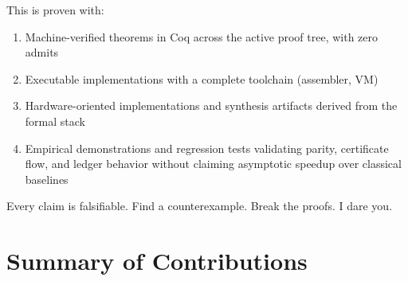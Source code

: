 This is proven with:
\begin{enumerate}
    \item Machine-verified theorems in Coq across the active proof tree, with zero admits
    \item Executable implementations with a complete toolchain (assembler, VM)
    \item Hardware-oriented implementations and synthesis artifacts derived from the formal stack
    \item Empirical demonstrations and regression tests validating parity, certificate flow, and ledger behavior without claiming asymptotic speedup over classical baselines
\end{enumerate}

Every claim is falsifiable. Find a counterexample. Break the proofs. I dare you.

\section{Summary of Contributions}

